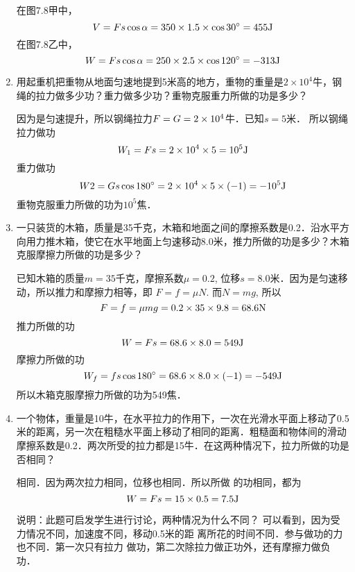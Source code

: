 \begin{enumerate}
\begin{figure}[htp]
\caption{}
\end{figure}


\begin{solution}
在图7.8甲中，
\[V=Fs\cos\alpha=350\times1.5\times\cos 30^{\circ}=455{\rm J}\]
在图7.8乙中，
\[W=Fs\cos\alpha=250\times2.5\times \cos120^{\circ}=-313{\rm J}\]
\end{solution}
    \item 用起重机把重物从地面匀速地提到5米高的地方，重物的重量是$2\times 10^4$牛，钢绳的拉力做多少功？重力做多少功？重物克服重力所做的功是多少？

    \begin{solution}
因为是匀速提升，所以钢绳拉力$F=G=2\times10^4$牛．已知$s=5$米．
所以钢绳拉力做功
\[W_1=Fs=2\times10^4\times5=10^5{\rm J}\]
重力做功
\[W2=Gs\cos180^{\circ}=2\times10^4\times5\times(-1)=-10^5{\rm J}\]
重物克服重力所做的功为$10^5$焦．
    \end{solution}
    \item 一只装货的木箱，质量是35千克，木箱和地面之间的摩擦系数是0.2．沿水平方向用力推木箱，使它在水平地面上匀速移动8.0米，推力所做的功是多少？木箱克服摩擦力所做的功是多少？

    \begin{solution}
        已知木箱的质量$m=35$千克，摩擦系数$\mu =0.2$, 位移$s=8.0$米．因为是匀速移动，所以推力和摩擦力相等，即
        $F=f=\mu N$. 而$N=mg$, 所以
        \[F=f=\mu mg=0.2\times35\times9.8=68.6{\rm N}\]
        推力所做的功
        \[W=Fs=68.6\times8.0=549{\rm J}\]
        摩擦力所做的功
        \[W_f=fs\cos180^{\circ}=68.6\times8.0\times(-1)=-549{\rm J}\]
        所以木箱克服摩擦力所做的功为549焦．
    \end{solution}
    \item 一个物体，重量是10牛，在水平拉力的作用下，一次在光滑水平面上移动了0.5米的距离，另一次在粗糙水平面上移动了相同的距离．粗糙面和物体间的滑动摩擦系数是0.2．两次所受的拉力都是15牛．在这两种情况下，拉力所做的功是否相同？

    \begin{solution}
    相同．因为两次拉力相同，位移也相同．所以所做
的功相同，都为
\[W=Fs=15\times0.5=7.5{\rm J}\]

说明：此题可启发学生进行讨论，两种情况为什么不同？
可以看到，因为受力情况不同，加速度不同，移动0.5米的距
离所花的时间不同．参与做功的力也不同．第一次只有拉力
做功，第二次除拉力做正功外，还有摩擦力做负功．
    \end{solution}
\end{enumerate}




